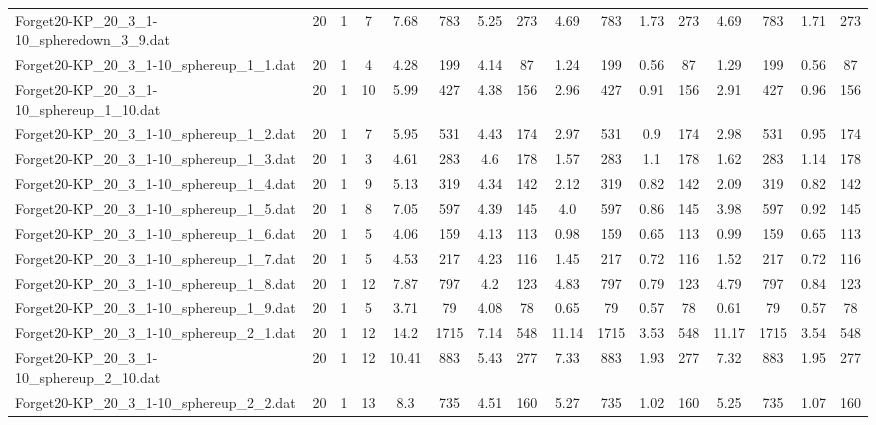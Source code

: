 \begin{sidewaystable}[!ht]
{\begin{tabular}{lccccccccccccccc}
Forget20-KP\_20\_3\_1-10\_spheredown\_3\_9.dat & 20 & 1 & 7 & 7.68 & 783 & 5.25 & 273 & 4.69 & 783 & 1.73 & 273 & 4.69 & 783 & 1.71 & 273 \\
Forget20-KP\_20\_3\_1-10\_sphereup\_1\_1.dat & 20 & 1 & 4 & 4.28 & 199 & 4.14 & 87 & 1.24 & 199 &  \textcolor{blue2}{0.56} & 87 & 1.29 & 199 &  \textcolor{blue2}{0.56} & 87 \\
Forget20-KP\_20\_3\_1-10\_sphereup\_1\_10.dat & 20 & 1 & 10 & 5.99 & 427 & 4.38 & 156 & 2.96 & 427 &  \textcolor{blue2}{0.91} & 156 & 2.91 & 427 & 0.96 & 156 \\
Forget20-KP\_20\_3\_1-10\_sphereup\_1\_2.dat & 20 & 1 & 7 & 5.95 & 531 & 4.43 & 174 & 2.97 & 531 &  \textcolor{blue2}{0.9} & 174 & 2.98 & 531 & 0.95 & 174 \\
Forget20-KP\_20\_3\_1-10\_sphereup\_1\_3.dat & 20 & 1 & 3 & 4.61 & 283 & 4.6 & 178 & 1.57 & 283 & 1.1 & 178 & 1.62 & 283 & 1.14 & 178 \\
Forget20-KP\_20\_3\_1-10\_sphereup\_1\_4.dat & 20 & 1 & 9 & 5.13 & 319 & 4.34 & 142 & 2.12 & 319 & 0.82 & 142 & 2.09 & 319 & 0.82 & 142 \\
Forget20-KP\_20\_3\_1-10\_sphereup\_1\_5.dat & 20 & 1 & 8 & 7.05 & 597 & 4.39 & 145 & 4.0 & 597 & 0.86 & 145 & 3.98 & 597 & 0.92 & 145 \\
Forget20-KP\_20\_3\_1-10\_sphereup\_1\_6.dat & 20 & 1 & 5 & 4.06 & 159 & 4.13 & 113 & 0.98 & 159 &  \textcolor{blue2}{0.65} & 113 & 0.99 & 159 &  \textcolor{blue2}{0.65} & 113 \\
Forget20-KP\_20\_3\_1-10\_sphereup\_1\_7.dat & 20 & 1 & 5 & 4.53 & 217 & 4.23 & 116 & 1.45 & 217 &  \textcolor{blue2}{0.72} & 116 & 1.52 & 217 &  \textcolor{blue2}{0.72} & 116 \\
Forget20-KP\_20\_3\_1-10\_sphereup\_1\_8.dat & 20 & 1 & 12 & 7.87 & 797 & 4.2 & 123 & 4.83 & 797 & 0.79 & 123 & 4.79 & 797 & 0.84 & 123 \\
Forget20-KP\_20\_3\_1-10\_sphereup\_1\_9.dat & 20 & 1 & 5 & 3.71 & 79 & 4.08 & 78 & 0.65 & 79 & 0.57 & 78 & 0.61 & 79 & 0.57 & 78 \\
Forget20-KP\_20\_3\_1-10\_sphereup\_2\_1.dat & 20 & 1 & 12 & 14.2 & 1715 & 7.14 & 548 & 11.14 & 1715 & 3.53 & 548 & 11.17 & 1715 & 3.54 & 548 \\
Forget20-KP\_20\_3\_1-10\_sphereup\_2\_10.dat & 20 & 1 & 12 & 10.41 & 883 & 5.43 & 277 & 7.33 & 883 & 1.93 & 277 & 7.32 & 883 & 1.95 & 277 \\
Forget20-KP\_20\_3\_1-10\_sphereup\_2\_2.dat & 20 & 1 & 13 & 8.3 & 735 & 4.51 & 160 & 5.27 & 735 &  \textcolor{blue2}{1.02} & 160 & 5.25 & 735 & 1.07 & 160 \\

\end{tabular}}
\end{sidewaystable}
